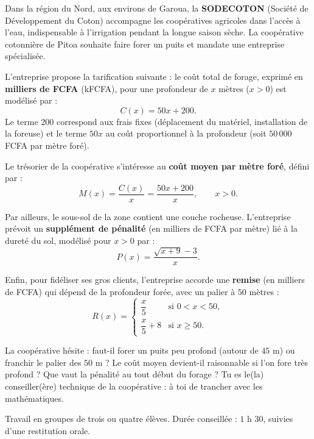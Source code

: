 \documentclass[11pt]{article}
\newcounter{popsec}
\newcounter{popsub}
\newcommand{\courssub}[1]{%
  \stepcounter{popsub}%
  \par\vspace{9pt}\noindent{\popxbold\fontsize{11.5}{13}\selectfont\color{popink}{\color{poporange}\thepopsec.\thepopsub}\hspace{6pt}#1}\par\nopagebreak\vspace{4pt}
}
\begin{document}
\courssub{Situation}

Dans la région du Nord, aux environs de Garoua, la \textbf{SODECOTON} (Société de Développement du Coton) accompagne les coopératives agricoles dans l'accès à l'eau, indispensable à l'irrigation pendant la longue saison sèche. La coopérative cotonnière de Pitoa souhaite faire forer un puits et mandate une entreprise spécialisée.

L'entreprise propose la tarification suivante : le coût total de forage, exprimé en \textbf{milliers de FCFA} (kFCFA), pour une profondeur de $x$ mètres ($x > 0$) est modélisé par :
\[ C(x) = 50x + 200. \]
Le terme $200$ correspond aux frais fixes (déplacement du matériel, installation de la foreuse) et le terme $50x$ au coût proportionnel à la profondeur (soit $50\,000$ FCFA par mètre foré).

Le trésorier de la coopérative s'intéresse au \textbf{coût moyen par mètre foré}, défini par :
\[ M(x) = \frac{C(x)}{x} = \frac{50x + 200}{x}, \qquad x > 0. \]

Par ailleurs, le sous-sol de la zone contient une couche rocheuse. L'entreprise prévoit un \textbf{supplément de pénalité} (en milliers de FCFA par mètre) lié à la dureté du sol, modélisé pour $x > 0$ par :
\[ P(x) = \frac{\sqrt{x+9} - 3}{x}. \]

Enfin, pour fidéliser ses gros clients, l'entreprise accorde une \textbf{remise} (en milliers de FCFA) qui dépend de la profondeur forée, avec un palier à $50$ mètres :
\[ R(x) = \begin{cases} \dfrac{x}{5} & \text{si } 0 < x < 50, \\[6pt] \dfrac{x}{5} + 8 & \text{si } x \geq 50. \end{cases} \]

La coopérative hésite : faut-il forer un puits peu profond (autour de $45$ m) ou franchir le palier des $50$ m ? Le coût moyen devient-il raisonnable si l'on fore très profond ? Que vaut la pénalité au tout début du forage ? Tu es le(la) conseiller(ère) technique de la coopérative : à toi de trancher avec les mathématiques.

\courssub{Consignes}

Travail en groupes de trois ou quatre élèves. Durée conseillée : $1$ h $30$, suivies d'une restitution orale.
\end{document}
